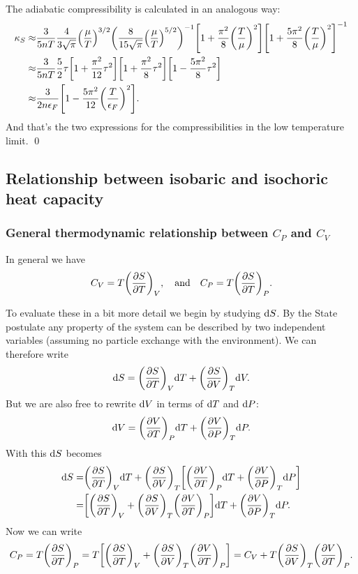 \documentclass[11pt,letter, swedish, english
]{article}
\begin{document}
The adiabatic compressibility is calculated in an analogous way:
\begin{equation}
\begin{aligned}
\kappa_S\approx& \frac{3}{5nT} 
\frac{4}{3\sqrt{\pi}}\qty(\frac{\mu}{T})^{3/2}
\qty(\frac{8}{15\sqrt{\pi}}\qty(\frac{\mu}{T})^{5/2})^{-1}
\qty[
1+\frac{\pi^2}{8}\qty(\frac{T}{\mu})^2]
\qty[
1+\frac{5\pi^2}{8}\qty(\frac{T}{\mu})^2]^{-1}\\
\approx&
 \frac{3}{5nT}\frac{5}{2}\tau\qty[1 +\frac{\pi^2}{12}\tau^2]
\qty[1+\frac{\pi^2}{8}\tau^2]
\qty[1-\frac{5\pi^2}{8}\tau^2]\\
\approx&\frac{3}{2n\epsilon_F}
\qty[1 - \frac{5\pi^2}{12}\qty(\frac{T}{\epsilon_F})^2].
\end{aligned}
\end{equation}
And that's the two expressions for the compressibilities in the low
temperature limit.
\qed

\subsection{Relationship between isobaric and isochoric heat capacity}

\subsubsection{General thermodynamic relationship between $C_P$ and $C_V$}
In general we have
\begin{equation}
C_V=T\qty(\pdv{S}{T})_V\qcomma\text{and}\quad
C_P=T\qty(\pdv{S}{T})_P.
\end{equation}

To evaluate these in a bit more detail we begin by studying
$\mathrm{d}{S}$. By the State postulate any property of the system can be
described by two independent variables (assuming no particle exchange
with the environment). We can therefore write
\begin{equation}
\mathrm{d}{S}=\qty(\pdv{S}{T})_V\mathrm{d}{T} + \qty(\pdv{S}{V})_T\mathrm{d}{V}.
\end{equation}
But we are also free to rewrite $\mathrm{d}{V}$ in terms of $\mathrm{d}{T}$ and
$\mathrm{d}{P}$:
\begin{equation}
\mathrm{d}{V}=\qty(\pdv{V}{T})_P\mathrm{d}{T} + \qty(\pdv{V}{P})_T\mathrm{d}{P}.
\end{equation}
With this $\mathrm{d}{S}$ becomes
\begin{equation}
\begin{aligned}
\mathrm{d}{S} =& \qty(\pdv{S}{T})_V\mathrm{d}{T} + \qty(\pdv{S}{V})_T
\qty[\qty(\pdv{V}{T})_P\mathrm{d}{T} + \qty(\pdv{V}{P})_T\mathrm{d}{P}]\\
=&\qty[\qty(\pdv{S}{T})_V+\qty(\pdv{S}{V})_T\qty(\pdv{V}{T})_P]\mathrm{d}{T}
+ \qty(\pdv{V}{P})_T\mathrm{d}{P}.
\end{aligned}
\end{equation}
Now we can write 
\begin{equation}
C_P=T\qty(\pdv{S}{T})_P
=T\qty[\qty(\pdv{S}{T})_V+\qty(\pdv{S}{V})_T\qty(\pdv{V}{T})_P]
=C_V+T\qty(\pdv{S}{V})_T\qty(\pdv{V}{T})_P.
\end{equation}
\end{document}
